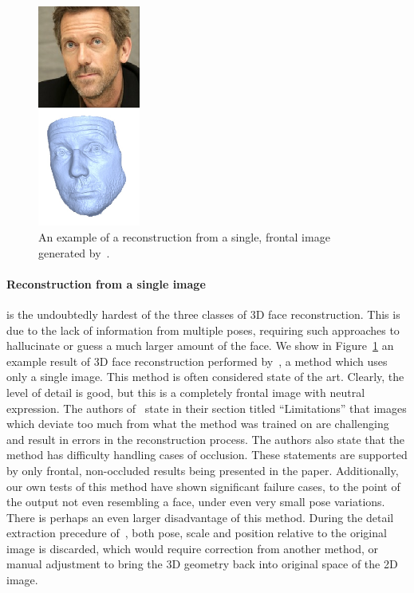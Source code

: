 \begin{figure}
  \includegraphics[width=0.3\textwidth,right]{img/unrestricted.png}
  \caption[Example output from Unrestricted Facial Geometry
  Reconstruction method]{An example of a reconstruction from a single,
    frontal image generated by~\cite{sela2017unrestricted}.}
  \label{fig:unrestricted}
\end{figure}

\paragraph{Reconstruction from a single image} is the undoubtedly
hardest of the three classes of 3D face reconstruction. This is due to
the lack of information from multiple poses, requiring such approaches
to hallucinate or guess a much larger amount of the face. We show in
Figure~\ref{fig:unrestricted} an example result of 3D face
reconstruction performed by~\cite{sela2017unrestricted}, a method
which uses only a single image. This method is often considered state
of the art. Clearly, the level of detail is good, but this is a
completely frontal image with neutral expression. The authors
of~\cite{sela2017unrestricted} state in their section titled
``Limitations'' that images which deviate too much from what the
method was trained on are challenging and result in errors in the
reconstruction process. The authors also state that the method has
difficulty handling cases of occlusion. These statements are supported
by only frontal, non-occluded results being presented in the
paper. Additionally, our own tests of this method have shown
significant failure cases, to the point of the output not even
resembling a face, under even very small pose variations. There is
perhaps an even larger disadvantage of this method. During the detail
extraction precedure of~\cite{sela2017unrestricted}, both pose, scale
and position relative to the original image is discarded, which would
require correction from another method, or manual adjustment to bring
the 3D geometry back into original space of the 2D image.

